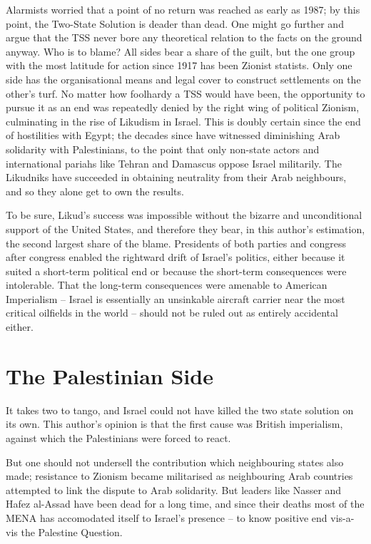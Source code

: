 \documentclass[letterpaper,12pt,twoside]{article} %
\begin{document}
\begin{multicols}{2}
Alarmists worried that a point of no return was reached as early as 1987; by this point, the Two-State Solution is deader than dead. One might go further and argue that the TSS never bore any theoretical relation to the facts on the ground anyway. Who is to blame? All sides bear a share of the guilt, but the one group with the most latitude for action since 1917 has been Zionist statists. Only one side has the organisational means and legal cover to construct settlements on the other's turf. No matter how foolhardy a TSS would have been, the opportunity to pursue it as an end was repeatedly denied by the right wing of political Zionism, culminating in the rise of Likudism in Israel. This is doubly certain since the end of hostilities with Egypt; the decades since have witnessed diminishing Arab solidarity with Palestinians, to the point that only non-state actors and international pariahs like Tehran and Damascus oppose Israel militarily. The Likudniks have succeeded in obtaining neutrality from their Arab neighbours, and so they alone get to own the results.

To be sure, Likud's success was impossible without the bizarre and unconditional support of the United States, and therefore they bear, in this author's estimation, the second largest share of the blame. Presidents of both parties and congress after congress enabled the rightward drift of Israel's politics, either because it suited a short-term political end or because the short-term consequences were intolerable. That the long-term consequences were amenable to American Imperialism -- Israel is essentially an unsinkable aircraft carrier near the most critical oilfields in the world -- should not be ruled out as entirely accidental either. 

\section{The Palestinian Side}

It takes two to tango, and Israel could not have killed the two state solution on its own. This author's opinion is that the first cause was British imperialism, against which the Palestinians were forced to react.

But one should not undersell the contribution which neighbouring states also made; resistance to Zionism became militarised as neighbouring Arab countries attempted to link the dispute to Arab solidarity. But leaders like Nasser and Hafez al-Assad have been dead for a long time, and since their deaths most of the MENA has accomodated itself to Israel's presence -- to know positive end vis-a-vis the Palestine Question.


\end{multicols}
\end{document}
